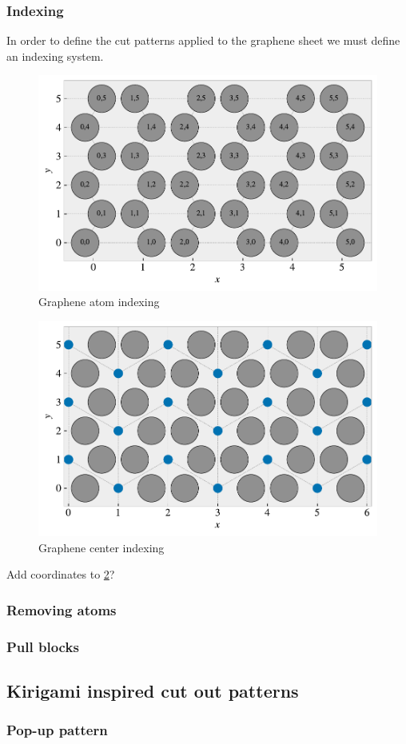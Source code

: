 \subsubsection{Indexing}

In order to define the cut patterns applied to the graphene sheet we must define an indexing system. 

\begin{figure}[H]
  \centering
  \includegraphics[width=0.5\linewidth]{figures/atom_indexing.pdf}
  \caption{Graphene atom indexing}
  \label{fig:atom_indexing}
\end{figure}

\begin{figure}[H]
  \centering
  \includegraphics[width=0.5\linewidth]{figures/center_indexing.pdf}
  \caption{Graphene center indexing}
  \label{fig:center_indexing}
\end{figure}


Add coordinates to \ref{fig:center_indexing}?

\subsubsection{Removing atoms}
\subsubsection{Pull blocks}
\subsection{Kirigami inspired cut out patterns}
\subsubsection{Pop-up pattern}
